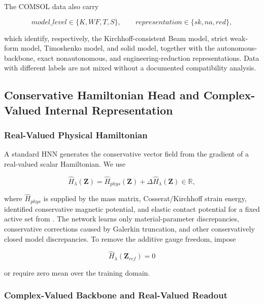 The COMSOL data also carry

\begin{equation}
\label{eq:chnn-4-3}
model\_ level \in \{ K,WF,T,S\},\quad\quad representation \in \{ sk,na,red\},
\end{equation}

which identify, respectively, the Kirchhoff-consistent Beam model, strict weak-form model, Timoshenko model, and solid model, together with the autonomous-backbone, exact nonautonomous, and engineering-reduction representations. Data with different labels are not mixed without a documented compatibility analysis.

\subsection{Conservative Hamiltonian Head and Complex-Valued Internal Representation}\label{sec:chnn-4-2}

\subsubsection{Real-Valued Physical Hamiltonian}\label{sec:chnn-4-2-1}

A standard HNN generates the conservative vector field from the gradient of a real-valued scalar Hamiltonian.\cite{Greydanus2019HNN} We use

\begin{equation}
\label{eq:chnn-4-4}
\boxed{{\widehat{H}}_{\lambda}\left( \mathbf{Z} \right) = {\widehat{H}}_{phys}\left( \mathbf{Z} \right) + \Delta{\widehat{H}}_{\lambda}\left( \mathbf{Z} \right) \in \mathbb{R},}
\end{equation}

where \({\widehat{H}}_{phys}\) is supplied by the mass matrix, Cosserat/Kirchhoff strain energy, identified conservative magnetic potential, and elastic contact potential for a fixed active set from . The network learns only material-parameter discrepancies, conservative corrections caused by Galerkin truncation, and other conservatively closed model discrepancies. To remove the additive gauge freedom, impose

\begin{equation}
\label{eq:chnn-4-5}
{\widehat{H}}_{\lambda}\left( \mathbf{Z}_{ref} \right) = 0
\end{equation}

or require zero mean over the training domain.

\subsubsection{Complex-Valued Backbone and Real-Valued Readout}\label{sec:chnn-4-2-2}

